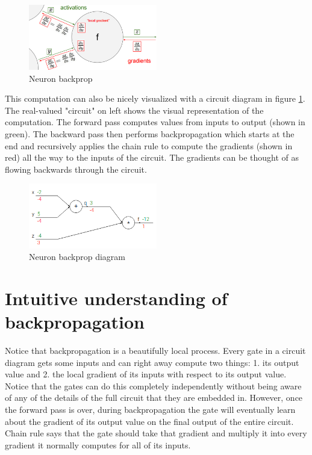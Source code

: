 \begin{figure}[h]
  \centering
  \includegraphics[width=0.5\textwidth]{Images/backprop/1.png}
  \caption{Neuron backprop}
\end{figure}

This computation can also be nicely visualized with a circuit diagram in figure \ref{fig:backdiag1}. The real-valued "circuit" on left shows the visual representation of the computation. The forward pass computes values from inputs to output (shown in green). The backward pass then performs backpropagation which starts at the end and recursively applies the chain rule to compute the gradients (shown in red) all the way to the inputs of the circuit. The gradients can be thought of as flowing backwards through the circuit.

\begin{figure}[h]
  \centering
  \includegraphics[width=0.5\textwidth]{Images/backprop/2.png}
  \caption{Neuron backprop diagram}
   \label{fig:backdiag1}
\end{figure}

\section*{Intuitive understanding of backpropagation}

Notice that backpropagation is a beautifully local process. Every gate in a circuit diagram gets some inputs and can right away compute two things: 1. its output value and 2. the local gradient of its inputs with respect to its output value. Notice that the gates can do this completely independently without being aware of any of the details of the full circuit that they are embedded in. However, once the forward pass is over, during backpropagation the gate will eventually learn about the gradient of its output value on the final output of the entire circuit. Chain rule says that the gate should take that gradient and multiply it into every gradient it normally computes for all of its inputs.

